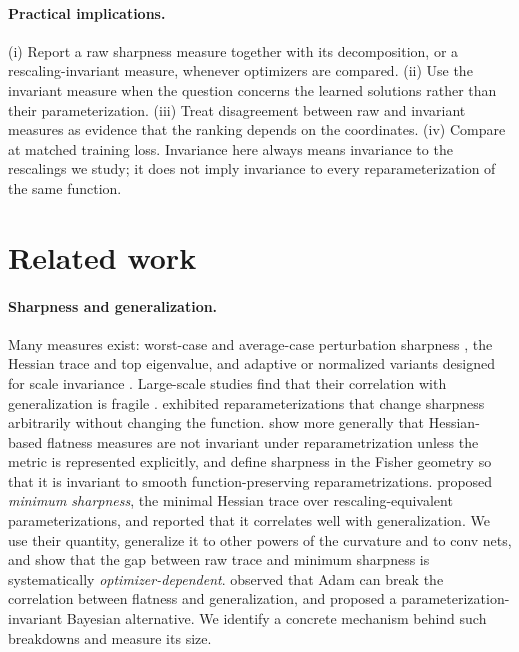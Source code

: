 \documentclass[10pt]{article}
\theoremstyle{remark}
\begin{document}
\paragraph{Practical implications.} (i) Report a raw sharpness measure together with its decomposition, or a rescaling-invariant measure, whenever optimizers are compared. (ii) Use the invariant measure when the question concerns the learned solutions rather than their parameterization. (iii) Treat disagreement between raw and invariant measures as evidence that the ranking depends on the coordinates. (iv) Compare at matched training loss. Invariance here always means invariance to the rescalings we study; it does not imply invariance to every reparameterization of the same function.

\section{Related work}
\paragraph{Sharpness and generalization.} Many measures exist: worst-case and average-case perturbation sharpness \citep{keskar2017large,jiang2020fantastic}, the Hessian trace and top eigenvalue, and adaptive or normalized variants designed for scale invariance \citep{kwon2021asam,tsuzuku2020normalized,petzka2021relative,rangamani2019scale,li2018visualizing}. Large-scale studies find that their correlation with generalization is fragile \citep{jiang2020fantastic,andriushchenko2023modern,kaur2023maximum}. \citet{dinh2017sharp} exhibited reparameterizations that change sharpness arbitrarily without changing the function. \citet{kristiadi2023geometry} show more generally that Hessian-based flatness measures are not invariant under reparametrization unless the metric is represented explicitly, and \citet{ahmed2026fisher} define sharpness in the Fisher geometry so that it is invariant to smooth function-preserving reparametrizations. \citet{ibayashi2021minimum} proposed \emph{minimum sharpness}, the minimal Hessian trace over rescaling-equivalent parameterizations, and reported that it correlates well with generalization. We use their quantity, generalize it to other powers of the curvature and to conv nets, and show that the gap between raw trace and minimum sharpness is systematically \emph{optimizer-dependent}. \citet{zhang2021flatness} observed that Adam can break the correlation between flatness and generalization, and proposed a parameterization-invariant Bayesian alternative. We identify a concrete mechanism behind such breakdowns and measure its size.
\end{document}

